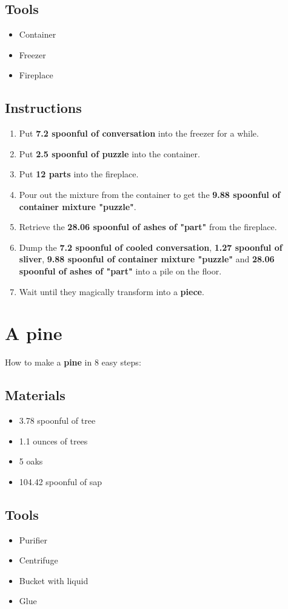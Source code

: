 \documentclass{article}
\begin{document}
\subsection{Tools}\begin{itemize}
\item 
Container
\item 
Freezer
\item 
Fireplace
\end{itemize}
\subsection{Instructions}\begin{enumerate}
\item 
Put \textbf{7.2 spoonful of conversation} into the freezer for a while.
\item 
Put \textbf{2.5 spoonful of puzzle} into the container.
\item 
Put \textbf{12 parts} into the fireplace.
\item 
Pour out the mixture from the container to get the \textbf{9.88 spoonful of container mixture "puzzle"}.
\item 
Retrieve the \textbf{28.06 spoonful of ashes of "part"} from the fireplace.
\item 
Dump the \textbf{7.2 spoonful of cooled conversation}, \textbf{1.27 spoonful of sliver}, \textbf{9.88 spoonful of container mixture "puzzle"} and \textbf{28.06 spoonful of ashes of "part"} into a pile on the floor.
\item 
Wait until they magically transform into a \textbf{piece}.
\end{enumerate}
\newpage
\section{A pine}How to make a \textbf{pine} in 8 easy steps:

\subsection{Materials}\begin{itemize}
\item 
3.78 spoonful of tree
\item 
1.1 ounces of trees
\item 
5 oaks
\item 
104.42 spoonful of sap
\end{itemize}
\subsection{Tools}\begin{itemize}
\item 
Purifier
\item 
Centrifuge
\item 
Bucket with liquid
\item 
Glue
\end{itemize}
\end{document}
